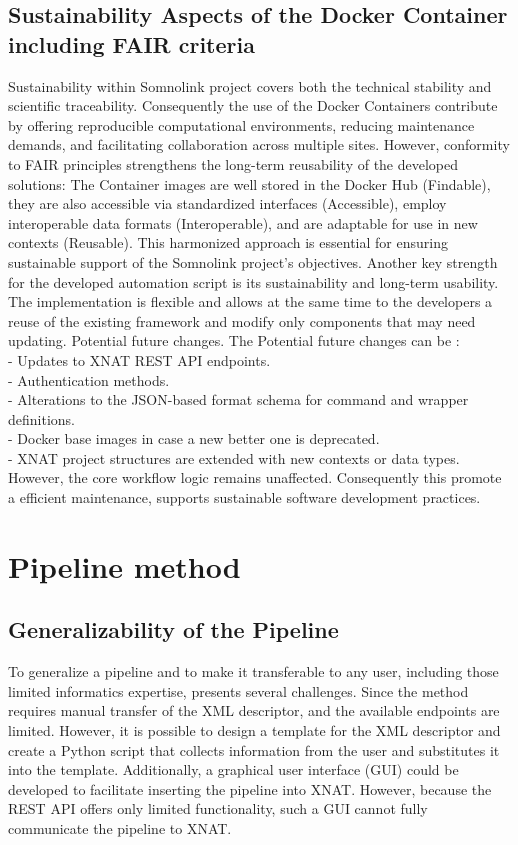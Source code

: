 \subsection{Sustainability Aspects of the Docker Container including FAIR criteria}
Sustainability within Somnolink project covers both the technical stability and scientific traceability. Consequently the use of the Docker Containers contribute by offering reproducible computational environments, reducing maintenance demands, and facilitating collaboration across multiple sites. However, conformity to FAIR principles strengthens the long-term reusability of the developed solutions: The Container images are well stored in the Docker Hub (Findable), they are also accessible via standardized interfaces (Accessible), employ interoperable data formats (Interoperable), and are adaptable for use in new contexts (Reusable). This harmonized approach is essential for ensuring sustainable support of the Somnolink project’s objectives. 
Another key strength for the developed automation script is its sustainability and long-term usability. The implementation is flexible and allows at the same time to the developers a reuse of the existing framework and modify only components that may need updating. Potential future changes. The Potential future changes can be :\\
- Updates to XNAT REST API endpoints.\\
- Authentication methods.\\
-  Alterations to the JSON-based format schema for command and wrapper definitions.\\
-  Docker base images in case a new better one is deprecated.\\
- XNAT project structures are extended with new contexts or data types.\\
However, the core workflow logic remains unaffected. Consequently this promote a efficient maintenance, supports sustainable software development practices.

\section{Pipeline method}
\subsection{Generalizability of the Pipeline}

To generalize a pipeline and to make it transferable to any user, including those limited informatics expertise, presents several challenges.
Since the method requires manual transfer of the XML descriptor,  and the available endpoints are limited. 
However, it is possible to design a template for the XML descriptor and create a Python script that collects information from the user and substitutes it into the template. Additionally, a graphical user interface (GUI) could be developed to facilitate inserting the pipeline into XNAT. However, because the REST API offers only limited functionality, such a GUI cannot fully communicate the pipeline to XNAT.




